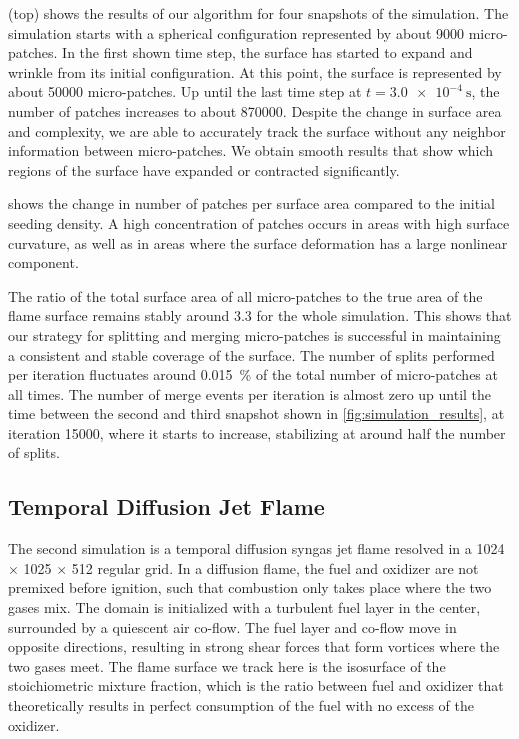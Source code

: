 %
 (top) shows the results of our algorithm for
four snapshots of the simulation.
%
The simulation starts with a spherical configuration represented by about
9000 micro-patches.
%
In the first shown time step, the surface has started to expand and wrinkle from
its initial configuration.
%
At this point, the surface is represented by about 50000 micro-patches.
%
Up until the last time step at $t=\SI{3.0e-4}{\second}$, the number of patches
increases to about 870000.
%
Despite the change in surface area and complexity, we are able to accurately
track the surface without any neighbor information between micro-patches.
%
We obtain smooth results that show which regions of the surface have expanded or
contracted significantly.
%

%
 shows the change in number of patches per
surface area compared to the initial seeding density.
%
A high concentration of patches occurs in areas with high surface curvature, as
well as in areas where the surface deformation has a large nonlinear component.
%

%
The ratio of the total surface area of all micro-patches to the true area of the
flame surface remains stably around \num{3.3} for the whole simulation.
%
This shows that our strategy for splitting and merging micro-patches is
successful in maintaining a consistent and stable coverage of the surface.
%
The number of splits performed per iteration fluctuates around
\SI{0.015}{\percent} of the total number of micro-patches at all times.
%
The number of merge events per iteration is almost zero up until the time
between the second and third snapshot shown in
\cref{fig:simulation_results}, at
iteration 15000, where it starts to increase, stabilizing at around half the
number of splits.
%

%
%
\subsection{Temporal Diffusion Jet Flame} %
\label{sub:temporal_diffusion_jet_flame}
%
The second simulation is a temporal diffusion syngas jet flame resolved in a
1024 $\times$ 1025 $\times$ 512 regular grid.
%
In a diffusion flame, the fuel and oxidizer are not premixed before ignition,
such that combustion only takes place where the two gases mix.
%
The domain is initialized with a turbulent fuel layer in the center, surrounded
by a quiescent air co-flow.
%
The fuel layer and co-flow move in opposite directions, resulting in strong
shear forces that form vortices where the two gases meet.
%
The flame surface we track here is the isosurface of the stoichiometric mixture
fraction, which is the ratio between fuel and oxidizer that theoretically
results in perfect consumption of the fuel with no excess of the oxidizer.
%

